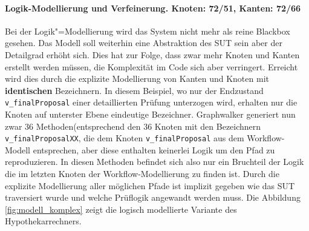 \paragraph{Logik-Modellierung und Verfeinerung. Knoten: 72/51, Kanten: 72/66} Bei der Logik"=Modellierung wird das System nicht mehr als reine Blackbox gesehen. Das Modell soll weiterhin eine Abstraktion des \Gls{SUT} sein aber der Detailgrad erhöht sich. Dies hat zur Folge, dass zwar mehr Knoten und Kanten erstellt werden müssen, die Komplexität im Code sich aber verringert. Erreicht wird dies durch die explizite Modellierung von Kanten und Knoten mit \textbf{identischen} Bezeichnern. In diesem Beispiel, wo nur der Endzustand \texttt{v\_finalProposal} einer detaillierten Prüfung unterzogen wird, erhalten nur die Knoten auf unterster Ebene eindeutige Bezeichner. Graphwalker generiert nun zwar 36 Methoden(entsprechend den 36 Knoten mit den Bezeichnern \texttt{v\_finalProposalXX}, die dem Knoten \texttt{v\_finalProposal} aus dem Workflow-Modell entsprechen, aber diese enthalten keinerlei Logik um den Pfad zu reproduzieren. In diesen Methoden befindet sich also nur ein Bruchteil der Logik die im letzten Knoten der Workflow-Modellierung zu finden ist. Durch die explizite Modellierung aller möglichen Pfade ist implizit gegeben wie das \Gls{SUT} traversiert wurde und welche Prüflogik angewandt werden muss. Die Abbildung \ref{fig:modell_komplex} zeigt die logisch modellierte Variante des Hypothekarrechners.


